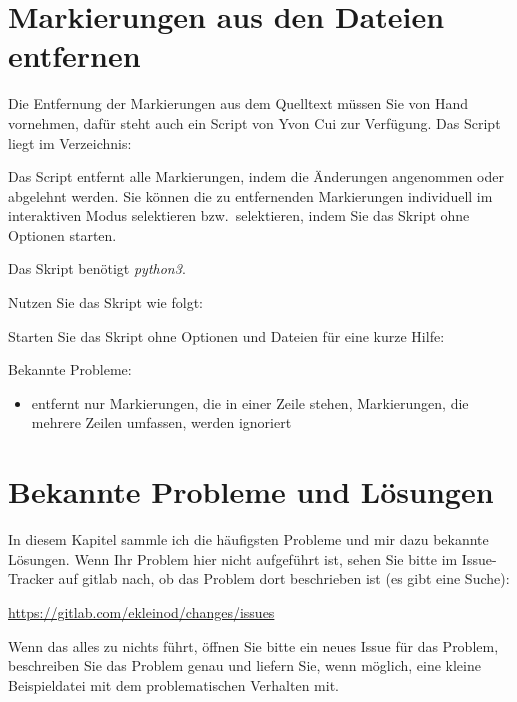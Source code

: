 \cleardoublepage
\section{Markierungen aus den Dateien entfernen}
\label{sec:remove-markup}

Die Entfernung der Markierungen aus dem Quelltext müssen Sie von Hand vornehmen, dafür steht auch ein Script von Yvon Cui zur Verfügung.
Das Script liegt im Verzeichnis:


Das Script entfernt alle Markierungen, indem die Änderungen angenommen oder abgelehnt werden.
Sie können die zu entfernenden Markierungen individuell im interaktiven Modus selektieren bzw.\ selektieren, indem Sie das Skript ohne Optionen starten.

Das Skript benötigt \emph{python3}.

Nutzen Sie das Skript wie folgt:


Starten Sie das Skript ohne Optionen und Dateien für eine kurze Hilfe:


Bekannte Probleme:

\begin{itemize}
	\item entfernt nur Markierungen, die in einer Zeile stehen, Markierungen, die mehrere Zeilen umfassen, werden ignoriert
\end{itemize}



\cleardoublepage
\section{Bekannte Probleme und Lösungen}
\label{sec:known-problems}

In diesem Kapitel sammle ich die häufigsten Probleme und mir dazu bekannte Lösungen.
Wenn Ihr Problem hier nicht aufgeführt ist, sehen Sie bitte im Issue-Tracker auf gitlab nach, ob das Problem dort beschrieben ist (es gibt eine Suche):

\url{https://gitlab.com/ekleinod/changes/issues}

Wenn das alles zu nichts führt, öffnen Sie bitte ein neues Issue für das Problem, beschreiben Sie das Problem genau und liefern Sie, wenn möglich, eine kleine Beispieldatei mit dem problematischen Verhalten mit.


